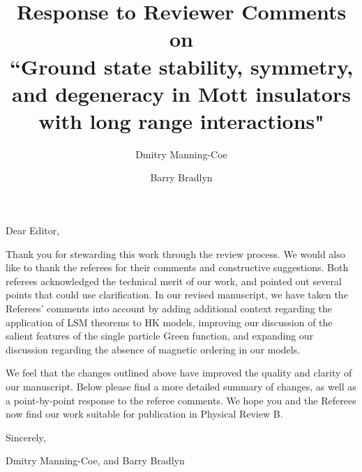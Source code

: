 \documentclass[aps,reprint,notitlepage,onecolumn,12pt]{revtex4-2}
\numberwithin{equation}{section}
\begin{document}
\title{Response to Reviewer Comments on \\``Ground state stability, symmetry, and degeneracy in Mott insulators with long range interactions" }
\author{Dmitry Manning-Coe}
\author{Barry Bradlyn}
\maketitle

Dear Editor,

Thank you for stewarding this work through the review process. We would also like to thank the referees for their comments and constructive suggestions. Both referees acknowledged the technical merit of our work, and pointed out several points that could use clarification. In our revised manuscript, we have taken the Referees' comments into account by adding additional context regarding the application of LSM theorems to HK models, improving our discussion of the salient features of the single particle Green function, and expanding our discussion regarding the absence of magnetic ordering in our models.

We feel that the changes outlined above have improved the quality and clarity of our manuscript. Below please find a more detailed summary of changes, as well as a point-by-point response to the referee comments. We hope you and the Referees now find our work suitable for publication in Physical Review B.

\vspace{5ex}

Sincerely,

{Dmitry Manning-Coe},
and {Barry Bradlyn}

\newpage
\end{document}
